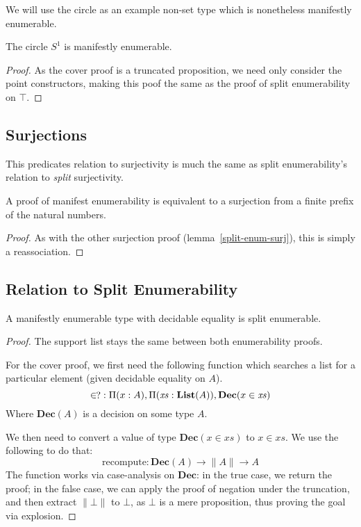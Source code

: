 We will use the circle as an example non-set type which is nonetheless
manifestly enumerable.
\begin{rm-theorem}
  The circle \(S^1\) is manifestly enumerable.
\end{rm-theorem}
\begin{proof}
  As the cover proof is a truncated proposition, we need only consider the point
  constructors, making this poof the same as the proof of split enumerability on
  \(\top\).
\end{proof}
\subsection{Surjections}
This predicates relation to surjectivity is much the same as split
enumerability's relation to \emph{split} surjectivity.
\begin{rm-lemma}
  A proof of manifest enumerability is equivalent to a surjection from a finite
  prefix of the natural numbers.
\end{rm-lemma}
\begin{proof}
  As with the other surjection proof (lemma~\ref{split-enum-surj}), this is
  simply a reassociation.
\end{proof}
\subsection{Relation to Split Enumerability}
\begin{rm-theorem} \label{manifest-enum-to-split}
  A manifestly enumerable type with decidable equality is split enumerable.
\end{rm-theorem}
\begin{proof}
  The support list stays the same between both enumerability proofs.

  For the cover proof, we first need the following function which searches a
  list for a particular element (given decidable equality on \(A\)).
  \begin{equation}
    \decin \; : \Pi(x : A) , \Pi(\mathit{xs} : \mathbf{List}(A)) , \mathbf{Dec}(x \in \mathit{xs})
  \end{equation}
  Where \(\mathbf{Dec}(A)\) is a decision on some type \(A\).

  We then need to convert a value of type \(\mathbf{Dec}(x \in \mathit{xs})\) to
  \(x \in \mathit{xs}\).
  We use the following to do that:
  \begin{equation}
    \text{recompute} : \mathbf{Dec}(A) \rightarrow \lVert A \rVert \rightarrow A
  \end{equation}
  The function works via case-analysis on \(\mathbf{Dec}\): in the true case, we
  return the proof; in the false case, we can apply the proof of negation under
  the truncation, and then extract \(\lVert \bot \rVert\) to \(\bot\), as
  \(\bot\) is a mere proposition, thus proving the goal via explosion.
\end{proof}
